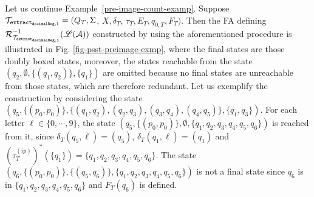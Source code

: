                     \begin{example}
                        Let us continue Example~\ref{pre-image-count-examp}. Suppose $\mathcal{T}_{\tt extract_{decimalReg,1}} = (Q_T, \Sigma$, $X, \delta_T$, $\tau_T, E_T,  q_{0, T}, F_T)$. Then the FA defining $\mathcal{R}^{-1}_{\mathcal{T}_{\tt extract_{decimalReg,1}}}(\mathscr{L}(\mathcal{A}))$ constructed by using the aforementioned procedure is illustrated in Fig. \ref{fig-psst-preimage-exmp}, where the final states are those doubly boxed states, moreover, the states reachable from the state $(q_2, \emptyset, \{(q_1,q_2)\}, \{q_1\})$ are omitted because no final states are unreachable from those states, which are therefore redundant. Let us exemplify the construction by considering the state $(q_5, \{(p_0,p_0)\}, \{(q_1,q_2), (q_2,q_3), (q_3,q_4), (q_4, q_5)\}, \{q_1,q_3\})$. For each letter $\ell \in \{0,\cdots, 9\}$, the state $(q_5, \{(p_0,p_0)\}, \emptyset, \{q_1,q_2, q_3, q_4, q_5, q_6\})$ is reached from it, since $\delta_T(q_5,\ell)  = (q_5)$, $\delta_T(q_1,\ell) = (q_1)$ and $(\tau^{(ip)}_T)^*(\{q_1\}) = \{q_1, q_2, q_3, q_4, q_5, q_6\}$. The state $(q_6, \{(p_0,p_0)\}, \{(q_5,q_6)\}, \{q_1, q_2, q_3, q_4, q_5, q_6\})$ is not a final state since $q_6$ is in $\{q_1, q_2, q_3, q_4, q_5, q_6\}$ and $F_T(q_6)$ is defined.
                        \begin{figure}[ht]
                            \centering


\end{figure}
\end{example}
